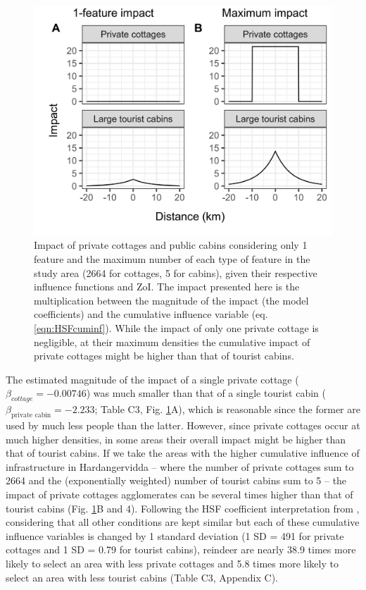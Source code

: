 \documentclass[titlepage]{article}
\begin{document}
\begin{figure}[h]
\centering
\includegraphics[width=1\textwidth,center]{figures/reindeer_zoi_impact_single_multiple_features.png}
\caption{\label{fig:impact_plot} Impact of private cottages and public cabins considering only 1 feature and the maximum number of each type of feature in the study area (2664 for cottages, 5 for cabins), given their respective influence functions and ZoI. The impact presented here is the multiplication between the magnitude of the impact (the model coefficients) and the cumulative influence variable (eq. \ref{eqn:HSFcuminf}). While the impact of only one private cottage is negligible, at their maximum densities the cumulative impact of private cottages might be higher than that of tourist cabins.}
\end{figure}

The estimated magnitude of the impact of a single private
cottage ($\beta_{cottage} = -0.00746$) was much smaller than that of a single tourist cabin
($\beta_{\text{private cabin}} = -2.233$; Table C3, Fig. \ref{fig:impact_plot}A), which is reasonable since the former are used by much less people than the latter. However, since
private cottages occur at much higher densities, in some areas their overall impact 
might be higher than that of tourist cabins. If we take the areas with the 
higher cumulative influence of infrastructure in Hardangervidda -- where the number of private cottages sum to 2664 
and the (exponentially weighted) number of tourist cabins sum to 5 -- the impact of 
private cottages agglomerates can be several times higher than that of tourist cabins
 (Fig. \ref{fig:impact_plot}B and 4). Following the HSF coefficient interpretation from \citealp{fieberg_how_2021}, considering that all other conditions are kept similar but each of these 
cumulative influence variables is changed by 1 standard deviation (1 SD = 491 for private cottages and
1 SD = 0.79 for tourist cabins), reindeer are nearly 38.9 times more likely to select an area with less private cottages and 5.8 times more likely
to select an area with less tourist cabins (Table C3, Appendix C).
\end{document}
